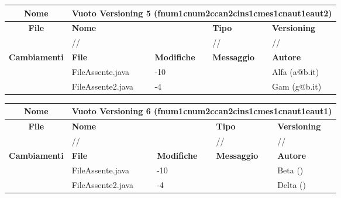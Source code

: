 \begin{table}[ht]
\footnotesize
\begin{tabular}{|c|p{2.5cm}|p{2cm}|p{2.5cm}|p{2.5cm}|}
  \hline
  \textbf{Nome}	& \multicolumn{4}{l|}{Vuoto Versioning 5 (fnum1cnum2ccan2cins1cmes1cnaut1eaut2)} 							\\
  \hline
  \rowcolor{lightgray}\textbf{File} 		& \multicolumn{2}{l|}{\textbf{Nome}}		& \textbf{Tipo}		& \textbf{Versioning} 		\\
						\cline{2-5}
						& \multicolumn{2}{l|}{//}			& //			& //				\\
  \hline
  \rowcolor{lightgray}\textbf{Cambiamenti}	& \textbf{File}		&\textbf{Modifiche}	& \textbf{Messaggio}	& \textbf{Autore}		\\
						\cline{2-5}
						& FileAssente.java	& -10	  		& 			& Alfa (a@b.it)		\\
						\cline{2-5}
						& FileAssente2.java	& -4	  		& 			& Gam (g@b.it)		\\
  \hline
\end{tabular}
\end{table}

\begin{table}[ht]
\footnotesize
\begin{tabular}{|c|p{2.5cm}|p{2cm}|p{2.5cm}|p{2.5cm}|}
  \hline
  \textbf{Nome}	& \multicolumn{4}{l|}{Vuoto Versioning 6 (fnum1cnum2ccan2cins1cmes1cnaut1eaut1)} 							\\
  \hline
  \rowcolor{lightgray}\textbf{File} 		& \multicolumn{2}{l|}{\textbf{Nome}}		& \textbf{Tipo}		& \textbf{Versioning} 		\\
						\cline{2-5}
						& \multicolumn{2}{l|}{//}			& //			& //				\\
  \hline
  \rowcolor{lightgray}\textbf{Cambiamenti}	& \textbf{File}		&\textbf{Modifiche}	& \textbf{Messaggio}	& \textbf{Autore}		\\
						\cline{2-5}
						& FileAssente.java	& -10	  		& 			& Beta ()			\\
						\cline{2-5}
						& FileAssente2.java	& -4	  		& 			& Delta ()			\\
  \hline
\end{tabular}
\end{table}

